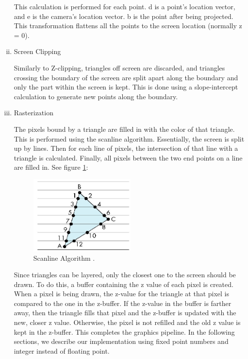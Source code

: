 \documentclass[onecolumn]{IEEEtran}
\begin{document}
\begin{enumerate}[i)]
This calculation is performed for each point.  d is a point's location vector, and e is the camera's location vector.  b is the point after being projected.  This transformation flattens all the points to the screen location (normally z = 0).
\item Screen Clipping

Similarly to Z-clipping, triangles off screen are discarded, and triangles crossing the boundary of the screen are split apart along the boundary and only the part within the screen is kept.  This is done using a slope-intercept calculation to generate new points along the boundary.

\item Rasterization

The pixels bound by a triangle are filled in with the color of that triangle.  This is performed using the scanline algorithm.  Essentially, the screen is split up by lines.  Then for each line of pixels, the intersection of that line with a triangle is calculated.  Finally, all pixels between the two end points on a line are filled in.  See figure \ref{fig:rasterization}:

\begin{figure}[H]
	\centering
	\includegraphics[width=0.50\textwidth]{rasterization.png}
	\caption{Scanline Algorithm \cite{rasterizer}.}
	\label{fig:rasterization}
\end{figure}


Since triangles can be layered, only the closest one to the screen should be drawn.  To do this, a buffer containing the z value of each pixel is created.  When a pixel is being drawn, the z-value for the triangle at that pixel is compared to the one in the z-buffer.  If the z-value in the buffer is farther away, then the triangle fills that pixel and the z-buffer is updated with the new, closer z value.  Otherwise, the pixel is not refilled and the old z value is kept in the z-buffer.  This completes the graphics pipeline.  In the following sections, we describe our implementation using fixed point numbers and integer instead of floating point.

\end{enumerate}
\end{document}
